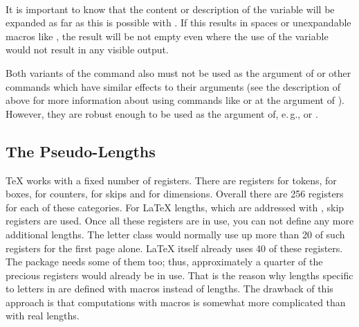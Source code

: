 \begin{Declaration}
  \\
\end{Declaration}
%
%
\begin{Explain}
  It is important to know that the content or description of the
  variable will be expanded as far as this is possible with
  . If this results in spaces or unexpandable macros like
  , the result will be not empty even where the use of
  the variable would not result in any visible output.
  
  Both variants of the command also must not be used as the argument
  of  or other commands
  which have similar effects to their arguments (see the description
  of  above for more information about using
  commands like  or  at the
  argument of ). However, they are robust enough
  to be used as the argument of, e.\,g.,  or
  .
\end{Explain}
%
%

\subsection{The Pseudo-Lengths}

{\TeX} works with a fixed number of registers. There are registers for tokens,
for boxes, for counters, for skips and for dimensions.  Overall there are 256
registers for each of these categories. For {\LaTeX} lengths, which are
addressed with , skip registers are used. Once all these
registers are in use, you can not define any more additional lengths.  The
letter class  would normally use up more than 20 of such
registers for the first page alone. {\LaTeX} itself already uses 40 of these
registers. The  package needs some of them too; thus,
approximately a quarter of the precious registers would already be in
use. That is the reason why lengths specific to letters in 
are defined with macros instead of lengths. The drawback of this approach is
that computations with macros is somewhat more complicated than with real
lengths.

